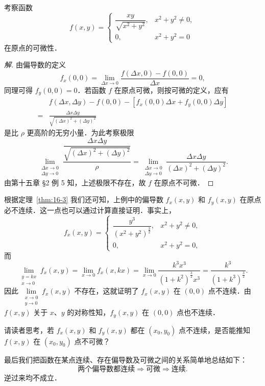 \begin{example}\label{ex:16-1-5}
考察函数
\[
f(x,y)=\begin{cases}
\dfrac{xy}{\sqrt{x^{2}+y^{2}}}, & x^{2}+y^{2}\neq 0,\\
0, & x^{2}+y^{2}=0
\end{cases}
\]
在原点的可微性．
\end{example}

\begin{proof}[解]
由偏导数的定义
\[
f_{x}(0,0)=\lim_{\Delta x\to 0}\frac{f(\Delta x,0)-f(0,0)}{\Delta x}=0,
\]
同理可得 $f_{y}(0,0)=0$．若函数 $f$ 在原点可微，则按可微的定义，应有
\[
\begin{aligned}
&f(\Delta x,\Delta y)-f(0,0)-\left[f_{x}(0,0)\Delta x+f_{y}(0,0)\Delta y\right]\\
={}&\frac{\Delta x\Delta y}{\sqrt{(\Delta x)^{2}+(\Delta y)^{2}}}
\end{aligned}
\]
是比 $\rho$ 更高阶的无穷小量．为此考察极限
\[
\lim_{\substack{\Delta x\to 0\\ \Delta y\to 0}}\frac{\dfrac{\Delta x\Delta y}{\sqrt{(\Delta x)^{2}+(\Delta y)^{2}}}}{\rho}=\lim_{\substack{\Delta x\to 0\\ \Delta y\to 0}}\frac{\Delta x\Delta y}{(\Delta x)^{2}+(\Delta y)^{2}}.
\]
由第十五章 §2 例 5 知，上述极限不存在，故 $f$ 在原点不可微．
\end{proof}

根据定理~\ref{thm:16-3} 我们还可知，上例中的偏导数 $f_{x}(x,y)$ 和 $f_{y}(x,y)$ 在原点必不连续．这一点也可以通过计算直接证明．事实上，
\[
f_{x}(x,y)=\begin{cases}
\dfrac{y^{3}}{\left(x^{2}+y^{2}\right)^{\frac{3}{2}}}, & x^{2}+y^{2}\neq 0,\\[6pt]
0, & x^{2}+y^{2}=0,
\end{cases}
\]
而
\[
\lim_{\substack{y=kx\\ x\to 0}}f_{x}(x,y)=\lim_{x\to 0}f_{x}(x,kx)=\lim_{x\to 0}\frac{k^{3}x^{3}}{(1+k^{2})^{\frac{3}{2}}x^{3}}=\frac{k^{3}}{(1+k^{3})^{\frac{3}{2}}}.
\]
因此 $\lim\limits_{\substack{x\to 0\\ y\to 0}}f_{x}(x,y)$ 不存在，这就证明了 $f_{x}(x,y)$ 在 $(0,0)$ 点不连续．由 $f(x,y)$ 关于 $x$、$y$ 的对称性知，$f_{y}(x,y)$ 在 $(0,0)$ 点也不连续．

请读者思考，若 $f_{x}(x,y)$ 和 $f_{y}(x,y)$ 都在 $(x_{0},y_{0})$ 点不连续，是否能推知 $f(x,y)$ 在 $(x_{0},y_{0})$ 点不可微？

最后我们把函数在某点连续、存在偏导数及可微之间的关系简单地总结如下：
\[
\text{两个偏导数都连续}\Rightarrow\text{可微}\Rightarrow\text{连续}.
\]
逆过来均不成立．

